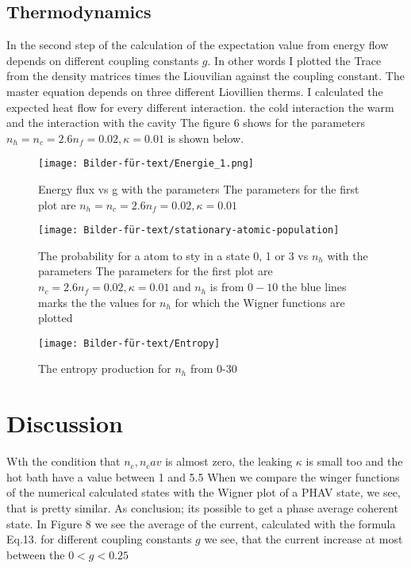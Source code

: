 \documentclass[12pt,a4paper]{article}
\begin{document}
\subsection{Thermodynamics}
In the second step of the calculation of the  expectation value from energy flow depends on different coupling constants $g$.
In other words I plotted the Trace from the density matrices times the Liouvilian against the coupling constant.
The master equation depends on three different Liovillien therms. I calculated the expected heat flow for every different interaction. the cold interaction the warm and the interaction with the cavity
The figure 6 shows  for the parameters $n_h=n_c=2.6 n_f=0.02,\kappa=0.01 $ is shown below.

\begin{figure}[hbtp]
\centering
\texttt{[image: Bilder-für-text/Energie\_1.png]}
\caption{Energy flux vs g with the parameters The parameters for the first plot are $n_h=n_c=2.6 n_f=0.02,\kappa=0.01 $}
\end{figure}


\newpage
\begin{figure}[hbtp]
\centering
\texttt{[image: Bilder-für-text/stationary-atomic-population]}
\caption{The probability for a atom to sty in a state 0, 1 or 3 vs $n_h$ with the parameters The parameters for the first plot are $n_c=2.6 n_f=0.02,\kappa=0.01 $ and $n_h$ is from $0-10$ the blue lines marks the the values for $ n_h$ for which the Wigner functions are plotted }
\end{figure}

\begin{figure}[hbtp]
\centering
\texttt{[image: Bilder-für-text/Entropy]}
\caption{The entropy production for $n_h$ from 0-30}
\end{figure}

\newpage

\section{Discussion}
Wth the condition that $n_c, n_cav$ is almost zero, the leaking $\kappa$ is small too and the hot bath have a value between 1 and 5.5 When we compare the winger functions of the numerical calculated states with the Wigner plot of a PHAV state, we see, that is pretty similar. As conclusion; its possible to get a phase average coherent state. 
In Figure 8 we see the average of the current, calculated with the formula Eq.13.  for different coupling constants $g$
we see, that the current increase at most between the $ 0<g<0.25$ 
 
\end{document}

